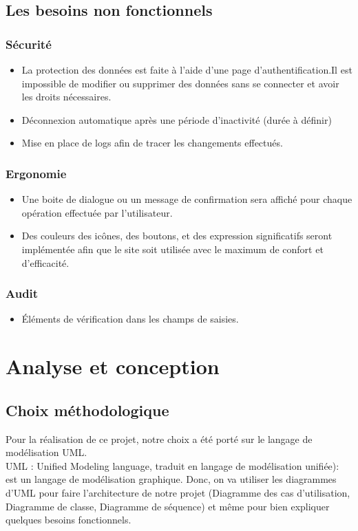 \documentclass[12pt,a4paper]{article}
\begin{document}
\subsection{Les besoins non fonctionnels}

\subsubsection{Sécurité}
\begin{itemize}
 \item La protection des données est faite à l'aide d'une page d'authentification.Il est impossible de modifier ou supprimer des données sans se connecter et avoir les droits nécessaires. 
 \item Déconnexion automatique après une période d'inactivité (durée à définir)
 \item Mise en place de logs afin de tracer les changements effectués.
\end{itemize}
\subsubsection{Ergonomie}
\begin{itemize}
\item Une boite de dialogue ou un message de confirmation sera affiché pour chaque opération effectuée par l'utilisateur.
\item Des couleurs des icônes, des boutons, et des expression significatifs seront implémentée afin que le site soit utilisée avec le maximum de confort et d'efficacité.
\end{itemize}
\subsubsection{Audit}
\begin{itemize}
\item Éléments de vérification dans les champs de saisies.
\end{itemize}

\section{Analyse et conception}

\subsection{Choix méthodologique}

Pour la réalisation de ce projet, notre choix a été porté sur le langage de modélisation UML.\\
UML : Unified Modeling language, traduit en langage de modélisation unifiée): est un langage de modélisation graphique.
Donc, on va utiliser les diagrammes d'UML pour faire l'architecture de notre projet (Diagramme des cas d'utilisation, Diagramme de classe, Diagramme de séquence) et même pour bien expliquer quelques besoins fonctionnels.\\  
\end{document}
